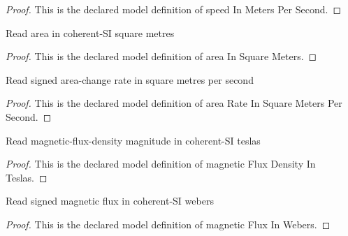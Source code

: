 \begin{proof}
  This is the declared model definition of speed In Meters Per Second.
\end{proof}
\begin{definition}
  \label{def:physics:phyx-mini-0918:phyxminiproblems-problemphyxmini0918-areainsquaremeters}
  Read area in coherent-SI square metres
\end{definition}
\begin{proof}
  This is the declared model definition of area In Square Meters.
\end{proof}
\begin{definition}
  \label{def:physics:phyx-mini-0918:phyxminiproblems-problemphyxmini0918-arearateinsquaremeterspersecond}
  Read signed area-change rate in square metres per second
\end{definition}
\begin{proof}
  This is the declared model definition of area Rate In Square Meters Per Second.
\end{proof}
\begin{definition}
  \label{def:physics:phyx-mini-0918:phyxminiproblems-problemphyxmini0918-magneticfluxdensityinteslas}
  Read magnetic-flux-density magnitude in coherent-SI teslas
\end{definition}
\begin{proof}
  This is the declared model definition of magnetic Flux Density In Teslas.
\end{proof}
\begin{definition}
  \label{def:physics:phyx-mini-0918:phyxminiproblems-problemphyxmini0918-magneticfluxinwebers}
  Read signed magnetic flux in coherent-SI webers
\end{definition}
\begin{proof}
  This is the declared model definition of magnetic Flux In Webers.
\end{proof}
